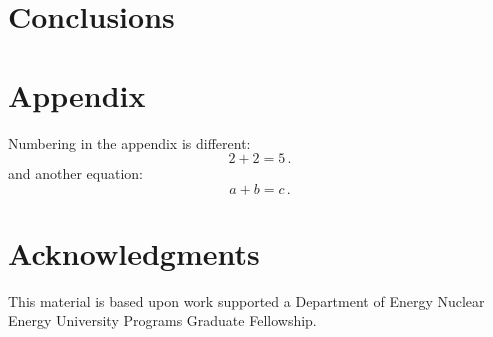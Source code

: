 \documentclass{anstrans}
\begin{document}
\section{Conclusions}

\appendix
\section{Appendix}

Numbering in the appendix is different:
\begin{equation} \label{eq:appendix}
  2 + 2 = 5\,.
\end{equation}
and another equation:
\begin{equation} \label{eq:appendix2}
  a + b = c\,.
\end{equation}

\section{Acknowledgments}
This material is based upon work supported a Department of Energy Nuclear
Energy University Programs Graduate Fellowship.


\end{document}
